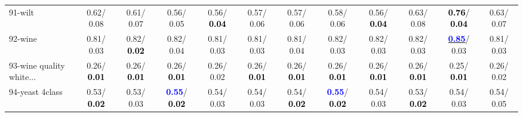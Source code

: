 \begin{table}[h]
\begin{center}
{\begin{tabular}{lc|c|c|c|c|c|c|c|c|c|c}
91-wilt &   0.62/  0.08 &   0.61/  0.07 &   0.56/  0.05 &   0.56/\textcolor{black}{\textbf{  0.04}} &   0.57/  0.06 &   0.57/  0.06 &   0.58/  0.06 &   0.56/\textcolor{black}{\textbf{  0.04}} &   0.63/  0.08 & \textcolor{black}{\textbf{  0.76}}/\textcolor{black}{\textbf{  0.04}} &   0.63/  0.07 \\
92-wine &   0.81/  0.03 &   0.82/\textcolor{black}{\textbf{  0.02}} &   0.82/  0.04 &   0.81/  0.03 &   0.81/  0.03 &   0.81/  0.04 &   0.82/  0.03 &   0.82/  0.03 &   0.82/  0.03 & \underline{\textcolor{blue}{\textbf{  0.85}}}/  0.03 &   0.81/  0.03 \\ \hline
93-wine quality white... &   0.26/\textcolor{black}{\textbf{  0.01}} &   0.26/\textcolor{black}{\textbf{  0.01}} &   0.26/\textcolor{black}{\textbf{  0.01}} &   0.26/  0.02 &   0.26/\textcolor{black}{\textbf{  0.01}} &   0.26/\textcolor{black}{\textbf{  0.01}} &   0.26/\textcolor{black}{\textbf{  0.01}} &   0.26/\textcolor{black}{\textbf{  0.01}} &   0.26/\textcolor{black}{\textbf{  0.01}} &   0.25/\textcolor{black}{\textbf{  0.01}} &   0.26/  0.02 \\
94-yeast 4class &   0.53/\textcolor{black}{\textbf{  0.02}} &   0.53/  0.03 & \textcolor{blue}{\textbf{  0.55}}/\textcolor{black}{\textbf{  0.02}} &   0.54/  0.03 &   0.54/  0.03 &   0.54/\textcolor{black}{\textbf{  0.02}} & \textcolor{blue}{\textbf{  0.55}}/\textcolor{black}{\textbf{  0.02}} &   0.54/  0.03 &   0.53/\textcolor{black}{\textbf{  0.02}} &   0.54/  0.03 &   0.54/  0.05 \\\end{tabular}
}\label{strats2aC4.5w}
\end{center}
\end{table}
